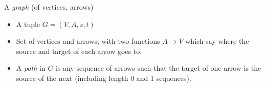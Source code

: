 
A \emph{graph} (of vertices, arrows)

\begin{itemize}
    \item A tuple $G=(V, A, s, t)$
    \item Set of vertices and arrows, with two functions $A\rightarrow V$ which say where the source and target of each arrow goes to.
    \item A \emph{path} in $G$ is any sequence of arrows such that the target of one arrow is the source of the next (including length 0 and 1 sequences).
  \end{itemize}